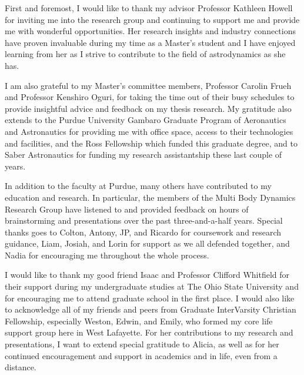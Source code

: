 {
\begin{acknowledgments}
    First and foremost, I would like to thank my advisor Professor Kathleen Howell for inviting me
    into the research group and continuing to support me and provide me with wonderful
    opportunities. Her research insights and industry connections have proven invaluable during my
    time as a Master's student and I have enjoyed learning from her as I strive to contribute to
    the field of astrodynamics as she has.

    I am also grateful to my Master's committee members, Professor Carolin Frueh and Professor
    Kenshiro Oguri, for taking the time out of their busy schedules to provide insightful advice
    and feedback on my thesis research. My gratitude also extends to the Purdue University Gambaro
    Graduate Program of Aeronautics and Astronautics for providing me with office space, access to
    their technologies and facilities, and the Ross Fellowship which funded this graduate degree,
    and to Saber Astronautics for funding my research assistantship these last couple of years. 

    In addition to the faculty at Purdue, many others have contributed to my education and
    research. In particular, the members of the Multi Body Dynamics Research Group have listened
    to and provided feedback on hours of brainstorming and presentations over the past
    three-and-a-half years. Special thanks goes to Colton, Antony, JP, and Ricardo for coursework
    and research guidance, Liam, Josiah, and Lorin for support as we all defended together, and
    Nadia for encouraging me throughout the whole process.

    I would like to thank my good friend Isaac and Professor Clifford Whitfield for their support
    during my undergraduate studies at The Ohio State University and for encouraging me to attend
    graduate school in the first place. I would also like to acknowledge all of my friends and
    peers from Graduate InterVarsity Christian Fellowship, especially Weston, Edwin, and Emily,
    who formed my core life support group here in West Lafayette. For her contributions to my
    research and presentations, I want to extend special gratitude to Alicia, as well as for her
    continued encouragement and support in academics and in life, even from a distance.


\end{acknowledgments}}

